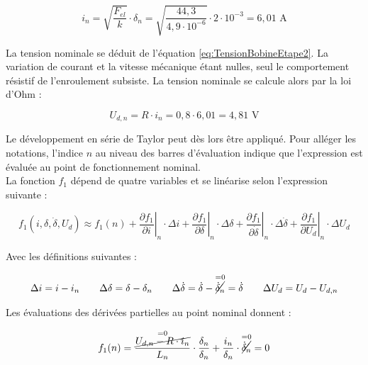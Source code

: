 \begin{equation}
    i_n = \sqrt{\frac{F_{el}}{k}}\cdot\delta_n = \sqrt{\frac{44,3}{4,9\cdot 10^{-6}}}\cdot 2\cdot 10^{-3} = 6,01 \text{ A}
\end{equation}

La tension nominale se déduit de l'équation \ref{eq:TensionBobineEtape2}. La variation de courant et la vitesse mécanique étant nulles, seul le comportement résistif de l'enroulement subsiste. La tension nominale se calcule alors par la loi d'Ohm :

\begin{equation}
    U_{d,n} = R\cdot i_n = 0,8 \cdot 6,01 = 4,81 \text{ V}
\end{equation}

Le développement en série de Taylor peut dès lors être appliqué. Pour alléger les notations, l'indice $n$ au niveau des barres d'évaluation indique que l'expression est évaluée au point de fonctionnement nominal.\\

La fonction $f_1$ dépend de quatre variables et se linéarise selon l'expression suivante :

\begin{equation}
    f_1(i, \delta, \dot{\delta}, U_d) \approx f_1(n)
    + \left. \frac{\partial f_1}{\partial i} \right|_{n}\cdot\Delta{i}
    + \left. \frac{\partial f_1}{\partial \delta} \right|_{n}\cdot\Delta{\delta}
    + \left. \frac{\partial f_1}{\partial \dot{\delta}} \right|_{n}\cdot\Delta{\dot{\delta}}
    + \left. \frac{\partial f_1}{\partial U_d} \right|_{n}\cdot\Delta{U_d}
    \label{eq:f1Lin1}
\end{equation}

Avec les définitions suivantes :

\begin{equation}
    \Delta i = i-i_n \qquad \Delta\delta = \delta-\delta_n \qquad \Delta\dot{\delta} = \dot{\delta}-\overset{=0}{\cancel{\dot{\delta}_n}} = \dot{\delta} \qquad \Delta U_d = U_d-U_{d,n}
    \label{eq:DeltaDef}
\end{equation}

Les évaluations des dérivées partielles au point nominal donnent :

\begin{equation}
    f_1(n)  = \frac{\overset{=0}{\cancel{U_{d,n} - R \cdot i_n}}}{L_n} \cdot \frac{\delta_n}{\delta_n} + \frac{i_n}{\delta_n} \cdot \overset{=0}{\cancel{\dot{\delta}_n}} = 0
    \label{eq:DerivePart1}
\end{equation}

